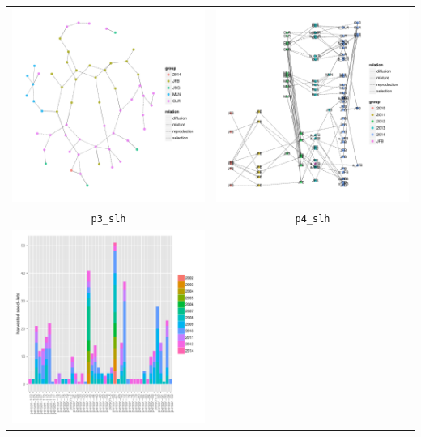 \documentclass{article}\usepackage[]{graphicx}\usepackage[]{color}
\newenvironment{knitrout}{}{} %
\begin{document}
\begin{itemize}
\begin{center}
\begin{tabular}{cc}
\begin{knitrout}
{\centering \includegraphics[width=.4\textwidth]{figures/shinemas2R_unnamed-chunk-29-1} 

}



\end{knitrout}
&
\begin{knitrout}
\definecolor{shadecolor}{rgb}{0.969, 0.969, 0.969}\color{fgcolor}

{\centering \includegraphics[width=.4\textwidth]{figures/shinemas2R_unnamed-chunk-30-1} 

}



\end{knitrout}
\\
\texttt{p3\_slh} & \texttt{p4\_slh} \\
\begin{knitrout}
\definecolor{shadecolor}{rgb}{0.969, 0.969, 0.969}\color{fgcolor}

{\centering \includegraphics[width=.4\textwidth]{figures/shinemas2R_unnamed-chunk-31-1} 

}
\end{knitrout}
\end{tabular}
\end{center}
\end{itemize}
\end{document}
